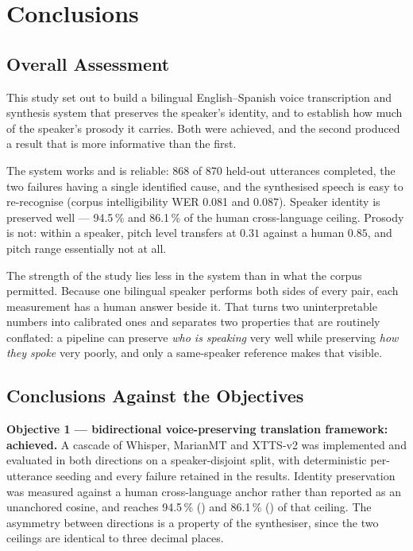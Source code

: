 \chapter{Conclusions}
\label{ch:conclusions}

\section{Overall Assessment}
\label{sec:assessment}

This study set out to build a bilingual English--Spanish voice transcription and synthesis system
that preserves the speaker's identity, and to establish how much of the speaker's prosody it
carries. Both were achieved, and the second produced a result that is more informative than the
first.

The system works and is reliable: 868 of 870 held-out utterances completed, the two failures having
a single identified cause, and the synthesised speech is easy to re-recognise (corpus
intelligibility WER 0.081 and 0.087). Speaker identity is preserved well --- 94.5\,\% and 86.1\,\%
of the human cross-language ceiling. Prosody is not: within a speaker, pitch level transfers at
$0.31$ against a human $0.85$, and pitch range essentially not at all.

The strength of the study lies less in the system than in what the corpus permitted. Because one
bilingual speaker performs both sides of every pair, each measurement has a human answer beside it.
That turns two uninterpretable numbers into calibrated ones and separates two properties that are
routinely conflated: a pipeline can preserve \emph{who is speaking} very well while preserving
\emph{how they spoke} very poorly, and only a same-speaker reference makes that visible.

\section{Conclusions Against the Objectives}
\label{sec:objectives_met}

\textbf{Objective 1 --- bidirectional voice-preserving translation framework: achieved.} A cascade
of Whisper, MarianMT and XTTS-v2 was implemented and evaluated in both directions on a
speaker-disjoint split, with deterministic per-utterance seeding and every failure retained in the
results. Identity preservation was measured against a human cross-language anchor rather than
reported as an unanchored cosine, and reaches 94.5\,\% (\ento{}) and 86.1\,\% (\esto{}) of that
ceiling. The asymmetry between directions is a property of the synthesiser, since the two ceilings
are identical to three decimal places.

